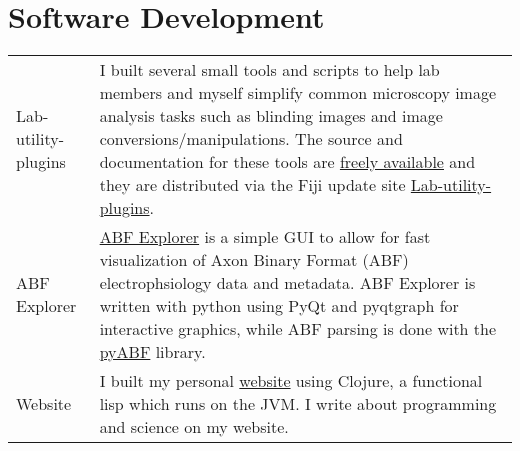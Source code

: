\documentclass[11pt]{article}
\begin{document}
\section*{Software Development}
\label{sec:orga6ca31b}
\begin{tabular}{lp{}}
Lab-utility-plugins& I built several small tools and scripts to help lab members and myself simplify common microscopy image analysis tasks such as blinding images and image conversions/manipulations. The source and documentation for these tools are \href{https://github.com/Macklin-Lab/imagej-microscopy-scripts}{freely available} and they are distributed via the Fiji update site \href{https://imagej.github.io/list-of-update-sites/}{Lab-utility-plugins}.\\
ABF Explorer& \href{https://github.com/nkicg6/ABF_Explorer}{ABF Explorer} is a simple GUI to allow for fast visualization of Axon Binary Format (ABF) electrophsiology data and metadata. ABF Explorer is written with python using PyQt and pyqtgraph for interactive graphics, while ABF parsing is done with the \href{https://github.com/swharden/pyABF}{pyABF} library.\\
Website& I built my personal \href{https://nickgeorge.net}{website} using Clojure, a functional lisp which runs on the JVM. I write about programming and science on my website.\\

\end{tabular}
\end{document}
